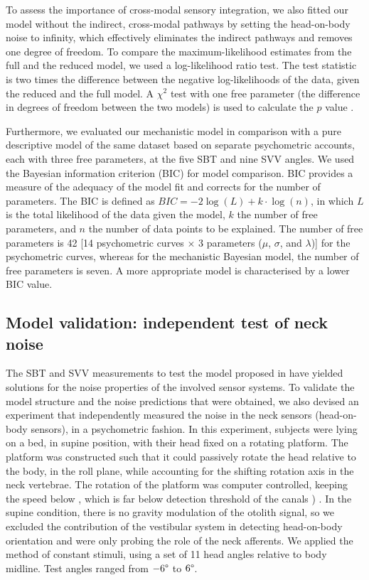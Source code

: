 To assess the importance of cross-modal sensory integration, we also fitted our model without the indirect, cross-modal pathways by setting the head-on-body noise to infinity, which effectively eliminates the indirect pathways and removes one degree of freedom. To compare the maximum-likelihood estimates from the full and the reduced model, we used a log-likelihood ratio test. The test statistic is two times the difference between the negative log-likelihoods of the data, given the reduced and the full model. A $\chi^2$ test with one free parameter (the difference in degrees of freedom between the two models) is used to calculate the $p$ value \cite{dobson2001}.

Furthermore, we evaluated our mechanistic model in comparison with a pure descriptive model of the same dataset based on separate psychometric accounts, each with three free parameters, at the five SBT and nine SVV angles. We used the Bayesian information criterion (BIC) for model comparison. BIC provides a measure of the adequacy of the model fit and corrects for the number of parameters. The BIC is defined as $BIC = -2 \log(L) + k \cdot \log(n)$, in which $L$ is the total likelihood of the data given the model, $k$ the number of free parameters, and $n$ the number of data points to be explained. The number of free parameters is 42 [14 psychometric curves $\times$ 3 parameters ($\mu$, $\sigma$, and $\lambda$)] for the psychometric curves, whereas for the mechanistic Bayesian model, the number of free parameters is seven. A more appropriate model is characterised by a lower BIC value. 


\subsection{Model validation: independent test of neck noise}
\label{p1:sec:model:necknoise}

The SBT and SVV measurements to test the model proposed in  have yielded solutions for the noise properties of the involved sensor systems. To validate the model structure and the noise predictions that were obtained, we also devised an experiment that independently measured the noise in the neck sensors (head-on-body sensors), in a psychometric fashion. In this experiment, subjects were lying on a bed, in supine position, with their head fixed on a rotating platform. The platform was constructed such that it could passively rotate the head relative to the body, in the roll plane, while accounting for the shifting rotation axis in the neck vertebrae. The rotation of the platform was computer controlled, keeping the speed below , which is far below detection threshold of the canals ) \cite{benson1989}. In the supine condition, there is no gravity modulation of the otolith signal, so we excluded the contribution of the vestibular system in detecting head-on-body orientation and were only probing the role of the neck afferents. We applied the method of constant stimuli, using a set of 11 head angles relative to body midline. Test angles ranged from $-6\degree$ to $6\degree$. 

